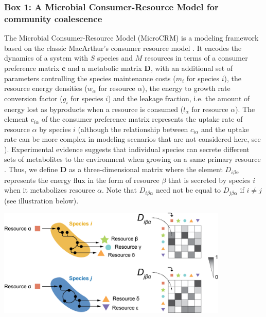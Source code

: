 \documentclass[a4paper,10pt]{article}
\begin{document}
\begin{mdframed}
\internallinenumbers
\subsubsection*{Box 1: A Microbial Consumer-Resource Model for community coalescence}
\label{box1}

The Microbial Consumer-Resource Model (MicroCRM) \cite{Goldford2018,Marsland2019,Marsland2020}
is a modeling framework based on the classic MacArthur's consumer resource model
\cite{MacArthur1970}.
It encodes the dynamics of a system with $S$ species and $M$ resources
in terms of a consumer preference matrix $\mathbf{c}$ and a metabolic matrix $\mathbf{D}$,
with an additional set of parameters controlling
the species maintenance costs ($m_i$ for species $i$),
the resource energy densities ($w_\alpha$ for resource $\alpha$),
the energy to growth rate conversion factor ($g_i$ for species $i$)
and the leakage fraction, i.e. the amount of energy lost as byproducts when a resource is consumed
($l_\alpha$ for resource $\alpha$).
The element $c_{i\alpha}$ of the consumer preference matrix
represents the uptake rate of resource $\alpha$ by
species $i$ (although the relationship between $c_{i\alpha}$ and the uptake rate can be more
complex in modeling scenarios that are not considered here,
see \cite{Goldford2018,Marsland2019,Marsland2020}).
Experimental evidence suggests that individual species can secrete different sets of metabolites
to the environment when growing on a same primary resource
\cite{Harcombe2014,Pinu2018,Estrela2020}.
Thus, we define $\mathbf{D}$ as a three-dimensional matrix
where the element $D_{i\beta\alpha}$ represents the energy flux in the form of resource $\beta$
that is secreted by species $i$ when it metabolizes resource $\alpha$.
Note that $D_{i\beta\alpha}$ need not be equal to $D_{j\beta\alpha}$ if $i \neq j$
(see illustration below).

\bigskip
\begin{center}
\includegraphics[width=11cm,keepaspectratio]{figs/figBox_v3.png}
\end{center}
\bigskip


\end{mdframed}
\end{document}
